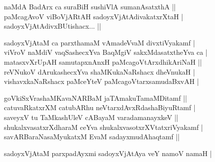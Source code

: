 \begin{entry}
\smallskip
\begin{shl}
naMdA BadArx ca suraBiH sushiVlA sumanAsatxthA ||\\[1pt]
paMcagAvoV viBoVjARtAH sadoyxVjAtAdivakatxrXtaH |\\[1pt]
sadoyxVjAtAdivxBUtishacx... ||
\end{shl}
\smallskip
{}
\smallskip
\begin{shl}
sadoyxVjAtaM ca parxthamaM vAmadeVvaM divxtiVyakamf |\\[1pt]
viVroV naMdiV vaqSashecxYva BaqMgiV sakxMdasatxtheYva ca |\\[1pt]
matasxvXrUpAH samutapxnAnxH paMcagoVtArxdhikAriNaH ||\\[1pt]
reVNukoV dArukashecxYva shaMKukaNaRshacx dheVnukaH |\\[1pt]
vishavxkaNaRshacx paMceYteV paMcagoVtarxsamudaBxvAH |
\end{shl}
\smallskip
{}
\smallskip
{}
\smallskip
\begin{shl}
goVkiSxVrashaMKavaNARBaM jaTAmakuTamaMDitamf ||\\[1pt]
catuvaRkatxrXM catubARhu neVtarxdAvxRdashaBiyuRtamf |\\[1pt]
saveyxV tu TaMkashUleV cABayaM varadamanayxkeV ||\\[1pt]
shukalxvasatxrXdharaM ceYva shukalxvasotxrXVtatxriVyakamf |\\[1pt]
savARBaraNasaMyukatxM EvaM sadayxmudAhaqtamf ||
\end{shl}
\smallskip
{}
\smallskip
{}
\smallskip
\begin{shl}
sadoyxVjAtaM parxpadAyxmi sadoyxVjAtAya veY namoV namaH |\\[1pt]

\end{shl}
\end{entry}
